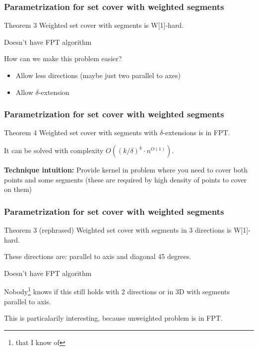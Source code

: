 \documentclass{beamer}
\begin{document}
\begin{frame}
\frametitle{Parametrization for set cover with weighted segments}
\begin{block}{Theorem 3}
	Weighted set cover with segments is W[1]-hard.
	
	Doesn't have FPT algorithm
\end{block}

How can we make this problem easier?
\begin{itemize}
\item Allow less directions (maybe just two parallel to axes)
\item Allow $\delta$-extension
\end{itemize}
\end{frame}

\begin{frame}
\frametitle{Parametrization for set cover with weighted segments}
\begin{block}{Theorem 4}
	Weighted set cover with segments 
	with $\delta$-extensions is in FPT.
	
	It can be solved with complexity $O((k/\delta)^k \cdot n^{O(1)})$.
\end{block}

\textbf{Technique intuition:} Provide kernel in problem where you need to
cover both points and some segments (these are required
by high density of points to cover on them)
\end{frame}

\begin{frame}
\frametitle{Parametrization for set cover with weighted segments}
\begin{block}{Theorem 3 (rephrased)}
	Weighted set cover with segments in 3 directions is W[1]-hard.
	
	
These directions are: parallel to axis and diagonal 45 degrees.
	
	Doesn't have FPT algorithm
\end{block}

Nobody\footnote{that I know of} knows if this still holds with
2 directions or in 3D with segments parallel to axis.

This is particalarily interesting, because unweighted problem is in FPT.

\end{frame}
\end{document}
